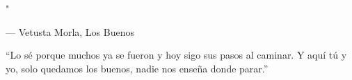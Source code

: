 
\epigraph{"}{--- \textup{Vetusta Morla}, Los Buenos}

\begin{savequote}[0.55\linewidth]
``Lo s\'{e} porque muchos ya se fueron y hoy sigo sus pasos al caminar. Y aqu\'{i} t\'{u} y yo, solo quedamos los buenos, nadie nos ense\~{n}a donde parar.''
\end{savequote}
